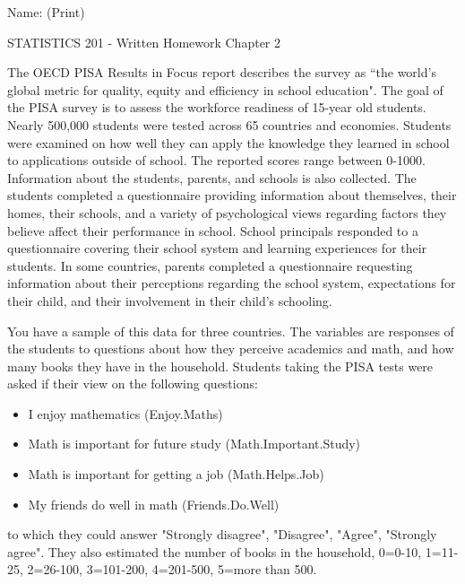 \documentclass{article}
\begin{document}
\hspace{2in} Name: (Print) \underline{\mbox{\hspace{3.5in}}}\\

\begin{center}
{\Large STATISTICS 201 - Written Homework Chapter 2}\\[3mm]
\end{center}

\noindent
The OECD PISA Results in Focus report describes the survey as ``the world's global metric for quality, equity and efficiency in school education". The goal of the PISA survey is to assess the workforce readiness of 15-year old students. Nearly 500,000 students were tested across 65 countries and economies. Students were examined on how well they can apply the knowledge they learned in school to applications outside of school. The  reported scores range between 0-1000. Information about the students, parents, and schools is also collected. The students completed a questionnaire providing information about themselves, their homes, their schools, and a variety of psychological views regarding factors they believe affect their performance in school. School principals responded to a questionnaire covering their school system and learning experiences for their students. In some countries, parents completed a questionnaire requesting information about their perceptions regarding the school system, expectations for their child, and their involvement in their child's schooling. 

You have a sample of this data for three countries. The variables are responses of the students to questions about how they perceive academics and math, and how many books they have in the household. Students taking the PISA tests were asked if their view on the following questions:

\begin{itemize} \itemsep 0in
\item I enjoy mathematics (Enjoy.Maths)
\item Math is important for future study (Math.Important.Study)
\item Math is important for getting a job (Math.Helps.Job)
\item My friends do well in math (Friends.Do.Well)
\end{itemize}

to which they could answer "Strongly disagree", "Disagree", "Agree", "Strongly agree". They also estimated the number of books in the household, 0=0-10, 1=11-25, 2=26-100, 3=101-200, 4=201-500, 5=more than 500.
\end{document}
